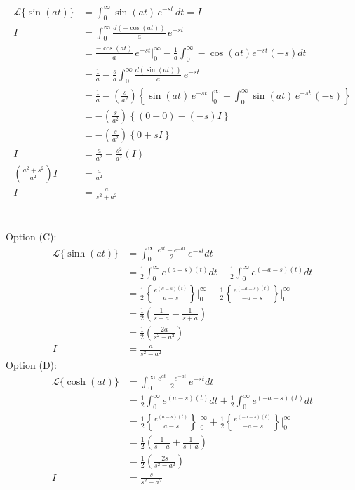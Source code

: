 \documentclass{article}
\begin{document}
\begin{align*}
    \mathcal{L}\{\sin(at)\}&=\int_{0}^{\infty}\sin(at)\,e^{-st}\,dt=I\\
                          I&=\int_{0}^{\infty}\frac{d(-\cos(at))}{a}\,e^{-st}\\
                           &=\frac{-\cos(at)}{a}\,e^{-st}\Bigg|_0^\infty-\frac{1}{a}\int_{0}^{\infty}-\cos(at)e^{-st}(-s)dt\\
                           &=\frac{1}{a}-\frac{s}{a}\int_0^\infty \frac{d(\sin(at))}{a}\,e^{-st}\\
                           &=\frac{1}{a}-(\frac{s}{a^2})\left\{\sin(at)\,e^{-st}\,\,\Bigg|_0^\infty-\int_0^\infty\sin(at)\,e^{-st}\,(-s)\right\}\\
                           &=-(\frac{s}{a^2})\left\{(0-0)-(-s)I\right\}\\
                           &=-(\frac{s}{a^2})\left\{0+sI\right\}\\
                          I&=\frac{a}{a^2}-\frac{s^2}{a^2}(I)\\
       \left(\frac{a^2+s^2}{a^2}\right)I&=\frac{a}{a^2}\\
                          I&=\frac{a}{s^2+a^2}
\end{align*}\bigskip\\\\
Option (C):\\
\begin{align*}
    \mathcal{L}\{\sinh(at)\}&=\int_0^\infty \frac{e^{at}-e^{-at}}{2}\,e^{-st} dt\\
                            &=\frac{1}{2}\int_0^\infty e^{(a-s)(t)} dt -\frac{1}{2}\int_0^\infty e^{(-a-s)(t)}dt\\
                            &=\frac{1}{2}\left\{\frac{e^{(a-s)(t)}}{a-s}\right\}\Bigg|_0^\infty-\frac{1}{2}\left\{\frac{e^{(-a-s)(t)}}{-a-s}\right\}\Bigg|_0^\infty\tag{assume s$>$a for integral to be finite}\\
                            &=\frac{1}{2}\left(\frac{1}{s-a}-\frac{1}{s+a}\right)\\
                            &=\frac{1}{2}\left(\frac{2a}{s^2-a^2}\right)\\
                           I&=\frac{a}{s^2-a^2}
\end{align*}
Option (D):\\
\begin{align*}
    \mathcal{L}\{\cosh(at)\}&=\int_0^\infty \frac{e^{at}+e^{-at}}{2}\,e^{-st} dt\\
                            &=\frac{1}{2}\int_0^\infty e^{(a-s)(t)} dt +\frac{1}{2}\int_0^\infty e^{(-a-s)(t)}dt\\
                            &=\frac{1}{2}\left\{\frac{e^{(a-s)(t)}}{a-s}\right\}\Bigg|_0^\infty+\frac{1}{2}\left\{\frac{e^{(-a-s)(t)}}{-a-s}\right\}\Bigg|_0^\infty\tag{assume s$>$a for integral to be finite}\\
                            &=\frac{1}{2}\left(\frac{1}{s-a}+\frac{1}{s+a}\right)\\
                            &=\frac{1}{2}\left(\frac{2s}{s^2-a^2}\right)\\
                           I&=\frac{s}{s^2-a^2}
\end{align*}
\end{document}
